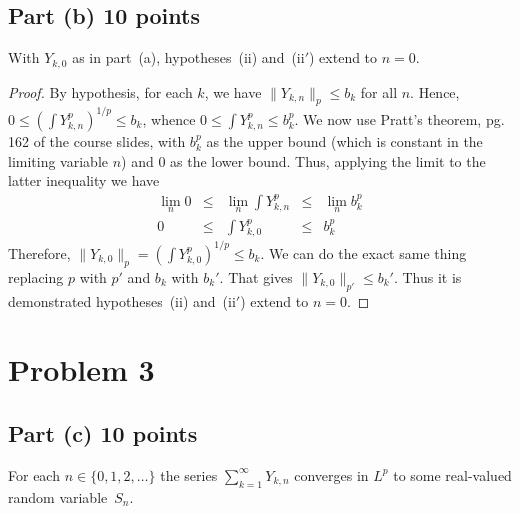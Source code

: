 \documentclass[letterpaper, 12pt]{article}
\begin{document}
\subsection*{Part (b) 10 points}
With $Y_{k, 0}$ as in part~(a), hypotheses~(ii) and~(ii$'$) extend to $n = 0$.
\begin{proof}
By hypothesis, for each $k$, we have $\|Y_{k,n} \|_p \leq b_k$ for all $n$. Hence, $0 \leq (\int Y_{k,n}^p)^{1/p} \leq b_k$, whence $0 \leq \int Y_{k,n}^p \leq b_k^p$. We now use Pratt's theorem, pg. 162 of the course slides, with $b_k^p$ as the upper bound (which is constant in the limiting variable $n$) and $0$ as the lower bound. Thus, applying the limit to the latter inequality we have 
\begin{equation*}
\begin{array}{rcccl}
\lim_n 0 & \leq & \lim_n \int Y_{k,n}^p & \leq & \lim_n b_k^p \\
0 & \leq & \int Y_{k,0}^p & \leq & b_k^p
\end{array}
\end{equation*}
Therefore, $\|Y_{k,0} \|_p = (\int Y_{k,0}^p)^{1/p} \leq b_k$. 
We can do the exact same thing replacing $p$ with $p'$ and $b_k$ with $b_k'$. 
That gives $\|Y_{k,0} \|_{p'} \leq b_{k}'$. 
Thus it is demonstrated hypotheses~(ii) and~(ii$'$) extend to $n = 0$.
\end{proof}

\pagebreak

\section*{Problem 3}
\subsection*{Part (c) 10 points}
For each $n \in \{0, 1, 2, \dots\}$ the series $\sum_{k = 1}^{\infty} Y_{k, n}$ converges in $L^p$ to some real-valued random variable~$S_n$.
\end{document}
